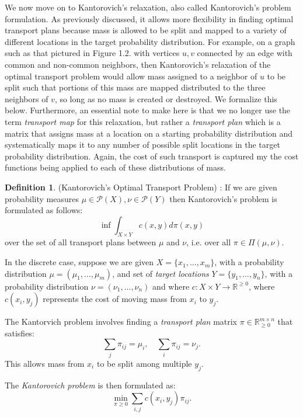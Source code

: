 \documentclass{Dissertate}
\theoremstyle{definition}
\theoremstyle{definition} %
\theoremstyle{definition}
\newtheorem{definition}[theorem]{Definition}
\begin{document}
We now move on to Kantorovich's relaxation, also called Kantorovich's problem formulation. As previously discussed, it allows more flexibility in finding optimal transport plans because mass is allowed to be split and mapped to a variety of different locations in the target probability distribution. For example, on a graph such as that pictured in Figure 1.2. with vertices $u,v$ connected by an edge with common and non-common neighbors, then Kantorovich's relaxation of the optimal transport problem would allow mass assigned to a neighbor of $u$ to be split such that portions of this mass are mapped distributed to the three neighbors of $v$, so long as no mass is created or destroyed. We formalize this below. Furthermore, an essential note to make here is that we no longer use the term \textit{transport map} for this relaxation, but rather a \textit{transport plan} which is a matrix that assigns mass at a location on a starting probability distribution and systematically maps it to any number of possible split locations in the target probability distribution. Again, the cost of such transport is captured my the cost functions being applied to each of these distributions of mass. 

\begin{definition} (Kantorovich's Optimal Transport Problem) \cite{VillaniCedric2009Ot:o}:
If we are given probability measures $\mu \in \mathcal{P}(X), \nu \in \mathcal{P}(Y)$ then Kantorovich's problem is formulated as follows: 
$$
\inf \int_{X \times Y} c(x,y)d\pi(x,y)
$$
over the set of all transport plans between $\mu$ and $\nu$, i.e. over all $\pi \in \Pi(\mu, \nu)$.
\end{definition}





In the discrete case, suppose we are given $X = \{x_1, \dots, x_m\}$, with a probability distribution $\mu = (\mu_1, \dots, \mu_m)$, and set of \textit{target locations} $Y = \{y_1, \dots, y_n\}$, with a probability distribution $\nu = (\nu_1, \dots, \nu_n)$ and where $ c: X \times Y \to \mathbb{R}^{\geq 0} $, where $ c(x_i, y_j) $ represents the cost of moving mass from $ x_i $ to $ y_j $.

The Kantorvich problem involves finding a \textit{transport plan} matrix $ \pi \in \mathbb{R}^{m \times n}_{\geq 0} $ that satisfies:
\[ \sum_{j} \pi_{ij} = \mu_i, \quad \sum_{i} \pi_{ij} = \nu_j. \]
This allows mass from $x_i$ to be split among multiple $y_j$.

The \textit{Kantorovich problem} is then formulated as:
\[ \min_{\pi \geq 0} \sum_{i,j} c(x_i, y_j) \pi_{ij}. \]
\end{document}
